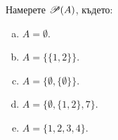 


\begin{problem}
  Намерете $\mathscr{P}(A)$, където:
  \begin{enumerate}[a)]
  \item
    $A= \emptyset$.
  \item
    $A= \{\{1,2\}\}$.
  \item
    $A= \{\emptyset, \{\emptyset\}\}$.
  \item
    $A= \{\emptyset, \{1,2\}, 7\}$.
  \item
    $A= \{1,2,3,4\}$.
  \end{enumerate}
\end{problem}

